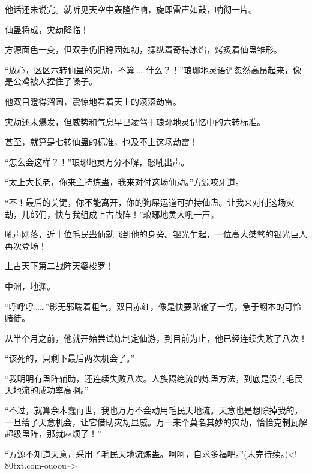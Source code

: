 \begin{this_body}
他话还未说完。就听见天空中轰隆作响，旋即雷声如鼓，响彻一片。

仙蛊将成，灾劫降临！

方源面色一变，但双手仍旧稳固如初，操纵着奇特冰焰，烤炙着仙蛊雏形。

“放心，区区六转仙蛊的灾劫，不算……什么？！”琅琊地灵语调忽然高昂起来，像是公鸡被人捏住了嗓子。

他双目瞪得溜圆，震惊地看着天上的滚滚劫雷。

灾劫还未爆发，但威势和气息早已凌驾于琅琊地灵记忆中的六转标准。

甚至，就算是七转仙蛊的标准，也及不上这场劫雷！

“怎么会这样？！”琅琊地灵万分不解，怒吼出声。

“太上大长老，你来主持炼蛊，我来对付这场仙劫。”方源咬牙道。

“不！最后的关键，你不能离开，你的狗屎运道可护持仙蛊。让我来对付这场灾劫，儿郎们，快与我组成上古战阵！”琅琊地灵大吼一声。

吼声刚落，近十位毛民蛊仙就飞到他的身旁。银光乍起，一位高大桀骜的银光巨人再次登场！

上古天下第二战阵天婆梭罗！

中洲，地渊。

“呼呼呼……”影无邪喘着粗气，双目赤红，像是快要赌输了一切，急于翻本的可怜赌徒。

从半个月之前，他就开始尝试炼制定仙游，到目前为止，他已经连续失败了八次！

“该死的，只剩下最后两次机会了。”

“我明明有蛊阵辅助，还连续失败八次。人族隔绝流的炼蛊方法，到底是没有毛民天地流的成功率高啊。”

“不过，就算余木蠢再世，我也万万不会动用毛民天地流。天意也是想除掉我的，一旦给了天意机会，让它借助灾劫显威。万一来个莫名其妙的灾劫，恰恰克制瓦解超级蛊阵，那就麻烦了！”

“方源不知道天意，采用了毛民天地流炼蛊。呵呵，自求多福吧。”(未完待续。)<!--80txt.com-ouoou-->

\end{this_body}

